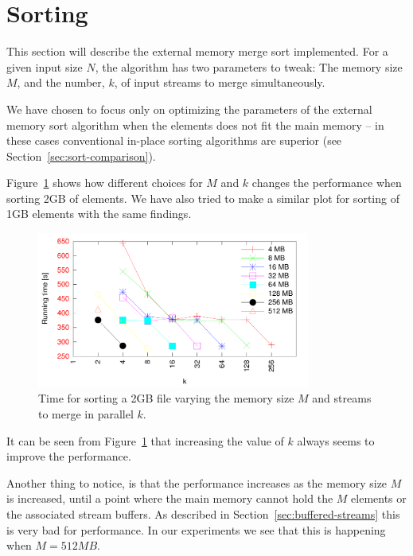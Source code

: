 \documentclass[a4paper,12pt]{article}
\begin{document}
\section{Sorting}
This section will describe the external memory merge sort
implemented. For a given input size $N$, the algorithm has two
parameters to tweak: The memory size $M$, and the number, $k$, of
input streams to merge simultaneously.

We have chosen to focus only on optimizing the parameters of the
external memory sort algorithm when the elements does not fit the main
memory -- in these cases conventional in-place sorting algorithms are
superior (see Section~\ref{sec:sort-comparison}).

Figure~\ref{fig:sorting} shows how different choices for $M$ and $k$
changes the performance when sorting 2GB of elements. We have also
tried to make a similar plot for sorting of 1GB elements with the same
findings.

\begin{figure}[h!]
  \centering
  \includegraphics[width=0.8\textwidth]{sorting}
  \caption{Time for sorting a 2GB file varying the memory size $M$ and
    streams to merge in parallel $k$.}
  \label{fig:sorting}
\end{figure}

It can be seen from Figure~\ref{fig:sorting} that increasing the value
of $k$ always seems to improve the performance.

Another thing to notice, is that the performance increases as the
memory size $M$ is increased, until a point where the main memory
cannot hold the $M$ elements or the associated stream buffers. As
described in Section~\ref{sec:buffered-streams} this is very bad for
performance. In our experiments we see that this is happening when $M
= 512MB$.
\end{document}
